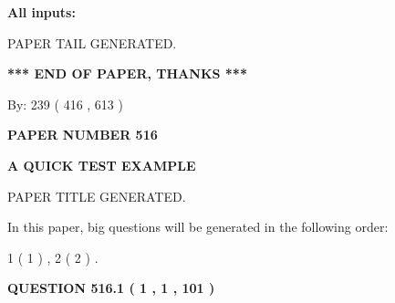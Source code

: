 \documentclass[12pt]{article}
\begin{document}
   
   
   
\noindent{}
   
   
   
   
\noindent\vspace{0.1in}\hspace{-0.08in} {\textbf{\Large{All inputs: }}}
   
   
   
   
   
   
 \vspace{0.2in}
 
   
   
\vspace{2.0in} PAPER TAIL GENERATED.
   
   
   
   
\vspace{1.0in} 
{\textbf{\large{ *** END OF PAPER, THANKS *** }}} 
   
   
\hspace{1.0in} By: 
 239 ( 416 ,  613 )
   
   
   
   
\newpage 
\setcounter{page}{ 
   516001 } 
   
   
   
   
 {\textbf{ \Large{ PAPER NUMBER  516  }}}
   
   
\vspace{0.2in}
   
   
   
   
   
   
   
   
 \vspace{0.2in}
{\LARGE {\textbf{ A QUICK TEST EXAMPLE}}}
   
   
 PAPER TITLE GENERATED.
   
   
   
\vspace{0.2in}
   
In this paper, big questions will be generated in the following order: 
   
   
   1 ( 1 )
 ,
   2 ( 2 )
 .
  
\vspace{0.2in}
  
{\textbf{\Large{QUESTION
516.1 
 ( 1 , 1 , 101 )
}}}
  
  
 
\end{document}
